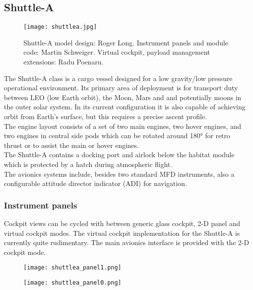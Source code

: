 \documentclass[Orbiter User Manual.tex]{subfiles}
\begin{document}
\subsection{Shuttle-A}

\begin{figure}[H]
  \centering
  \texttt{[image: shuttlea.jpg]}
  \caption{Shuttle-A model design: Roger Long. Instrument panels and module code: Martin Schweiger. Virtual cockpit, payload management extensions: Radu Poenaru.}
\end{figure}

\noindent
The Shuttle-A class is a cargo vessel designed for a low gravity/low pressure operational environment. Its primary area of deployment is for transport duty between LEO (low Earth orbit), the Moon, Mars and and potentially moons in the outer solar system. In its current configuration it is also capable of achieving orbit from Earth's surface, but this requires a precise ascent profile.\\
The engine layout consists of a set of two main engines, two hover engines, and two engines in central side pods which can be rotated around 180° for retro thrust or to assist the main or hover engines.\\
The Shuttle-A contains a docking port and airlock below the habitat module which is protected by a hatch during atmospheric flight.\\
The avionics systems include, besides two standard MFD instruments, also a configurable attitude director indicator (ADI) for navigation.

\subsubsection{Instrument panels}
Cockpit views can be cycled with  between generic glass cockpit, 2-D panel and virtual cockpit modes. The virtual cockpit implementation for the Shuttle-A is currently quite rudimentary. The main avionics interface is provided with the 2-D cockpit mode.

\begin{figure}[H]
  \centering
  \texttt{[image: shuttlea\_panel1.png]}
\end{figure}

\begin{figure}[H]
  \centering
  \texttt{[image: shuttlea\_panel0.png]}
\end{figure}
\end{document}
